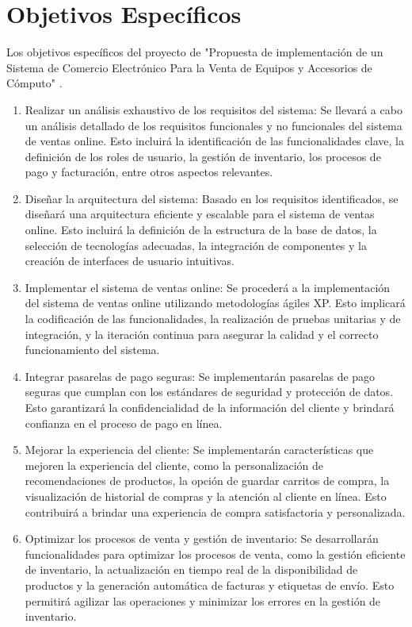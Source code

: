 \documentclass[12pt,a4paper]{article}
\newcommand{\newsection}[1]{\section{\hspace{4mm} #1}}%
\newcommand{\titulo}{"Propuesta de implementación de un Sistema de Comercio Electrónico Para la Venta de Equipos y Accesorios de Cómputo" }
\begin{document}
\newpage
\newsection{Objetivos Específicos}
Los objetivos específicos del proyecto de \titulo.%
\begin{enumerate}
\item Realizar un análisis exhaustivo de los requisitos del sistema: Se llevará a cabo un análisis detallado de los requisitos funcionales y no funcionales del sistema de ventas online. Esto incluirá la identificación de las funcionalidades clave, la definición de los roles de usuario, la gestión de inventario, los procesos de pago y facturación, entre otros aspectos relevantes.
\item Diseñar la arquitectura del sistema: Basado en los requisitos identificados, se diseñará una arquitectura eficiente y escalable para el sistema de ventas online. Esto incluirá la definición de la estructura de la base de datos, la selección de tecnologías adecuadas, la integración de componentes y la creación de interfaces de usuario intuitivas.
\item Implementar el sistema de ventas online: Se procederá a la implementación del sistema de ventas online utilizando metodologías ágiles XP. Esto implicará la codificación de las funcionalidades, la realización de pruebas unitarias y de integración, y la iteración continua para asegurar la calidad y el correcto funcionamiento del sistema.
\item Integrar pasarelas de pago seguras: Se implementarán pasarelas de pago seguras que cumplan con los estándares de seguridad y protección de datos. Esto garantizará la confidencialidad de la información del cliente y brindará confianza en el proceso de pago en línea.
\item Mejorar la experiencia del cliente: Se implementarán características que mejoren la experiencia del cliente, como la personalización de recomendaciones de productos, la opción de guardar carritos de compra, la visualización de historial de compras y la atención al cliente en línea. Esto contribuirá a brindar una experiencia de compra satisfactoria y personalizada.
\item Optimizar los procesos de venta y gestión de inventario: Se desarrollarán funcionalidades para optimizar los procesos de venta, como la gestión eficiente de inventario, la actualización en tiempo real de la disponibilidad de productos y la generación automática de facturas y etiquetas de envío. Esto permitirá agilizar las operaciones y minimizar los errores en la gestión de inventario.

\end{enumerate}
\end{document}
